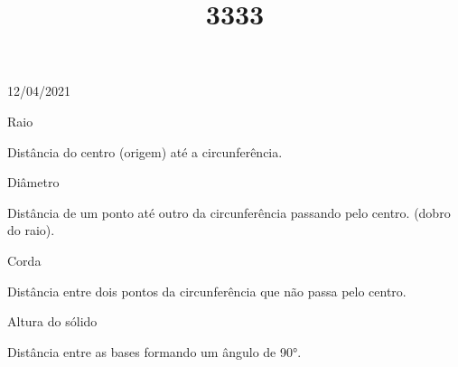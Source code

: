 \documentclass{SchoolBook}
\begin{document}
    \begin{day}{12/04/2021}
        \title{3}{Raio}

        Distância do centro (origem) até a circunferência.

        \title{3}{Diâmetro}

        Distância de um ponto até outro da circunferência passando pelo centro. (dobro do raio).

        \title{3}{Corda}

        Distância entre dois pontos da circunferência que não passa pelo centro.

        \title{3}{Altura do sólido}

        Distância  entre as bases formando um ângulo de 90°.

    \end{day}
      
\end{document}
